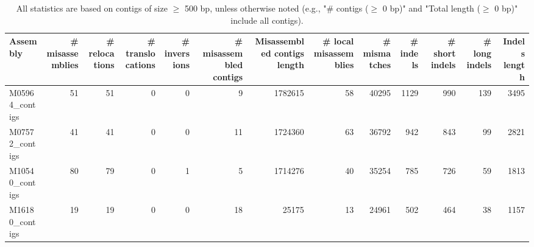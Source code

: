 \documentclass[12pt,a4paper]{article}
\begin{document}
\begin{table}[ht]
\begin{center}
\caption{All statistics are based on contigs of size $\geq$ 500 bp, unless otherwise noted (e.g., "\# contigs ($\geq$ 0 bp)" and "Total length ($\geq$ 0 bp)" include all contigs).}
\begin{tabular}{|l*{12}{|r}|}
\hline
Assembly & \# misassemblies &     \# relocations &     \# translocations &     \# inversions & \# misassembled contigs & Misassembled contigs length & \# local misassemblies & \# mismatches & \# indels &     \# short indels &     \# long indels & Indels length \\ \hline
M05964\_contigs & 51 & 51 & 0 & 0 & 9 & 1782615 & 58 & 40295 & 1129 & 990 & 139 & 3495 \\ \hline
M07572\_contigs & 41 & 41 & 0 & 0 & 11 & 1724360 & 63 & 36792 & 942 & 843 & 99 & 2821 \\ \hline
M10540\_contigs & 80 & 79 & 0 & 1 & 5 & 1714276 & 40 & 35254 & 785 & 726 & 59 & 1813 \\ \hline
M16180\_contigs & 19 & 19 & 0 & 0 & 18 & 25175 & 13 & 24961 & 502 & 464 & 38 & 1157 \\ \hline
\end{tabular}
\end{center}
\end{table}
\end{document}
